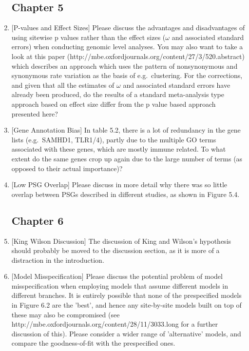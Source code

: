 \begin{enumerate}
\subsection{Chapter 5}

\item{[P-values and Effect Sizes] Please discuss the advantages and disadvantages of using sitewise p
values rather than the effect sizes ($\omega$ and associated standard
errors) when conducting genomic level analyses. You may also want to
take a look at this paper
(http://mbe.oxfordjournals.org/content/27/3/520.abstract) which
describes an approach which uses the pattern of nonsynonymous and
synonymous rate variation as the basis of e.g.\ clustering. For the
corrections, and given that all the estimates of $\omega$ and associated
standard errors have already been produced, do the results of a
standard meta-analysis type approach based on effect size differ from
the p value based approach presented here?}

\item{[Gene Annotation Bias] In table 5.2, there is a lot of redundancy in the gene lists
(e.g.\ SAMHD1, TLR1/4), partly due to the multiple GO terms associated
with these genes, which are mostly immune related. To what extent do
the same genes crop up again due to the large number of terms (as
opposed to their actual importance)?}

\item{[Low PSG Overlap] Please discuss in more detail why there was so little overlap between
PSGs described in different studies, as shown in Figure 5.4.}

\subsection{Chapter 6}

\item{[King Wilson Discussion] The discussion of King and Wilson's hypothesis should probably be
moved to the discussion section, as it is more of a distraction in the
introduction.}

\item{[Model Misspecification] Please discuss the potential problem of model misspecification when
employing models that assume different models in different
branches. It is entirely possible that none of the prespecified models
in Figure 6.2 are the 'best', and hence any site-by-site models built
on top of these may also be compromised (see
http://mbe.oxfordjournals.org/content/28/11/3033.long for a further
discussion of this). Please consider a wider range of 'alternative'
models, and compare the goodness-of-fit with the prespecified ones.}


\end{enumerate}
